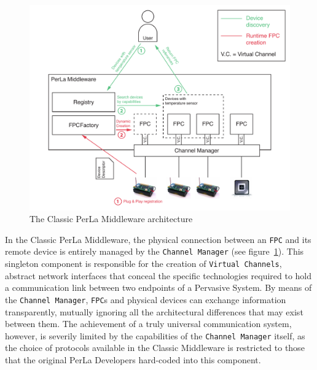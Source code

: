 \begin{figure}[h!]
\includegraphics[width=\textwidth]{imgs/classic_middleware_overview.pdf}
\caption{The Classic PerLa Middleware architecture}
\label{fig:classic_architecture}
\end{figure}

In the Classic PerLa Middleware, the physical connection between an
\texttt{FPC} and its remote device is entirely managed by the \texttt{Channel
Manager} (see figure~\ref{fig:classic_architecture}). This singleton component
is responsible for the creation of \texttt{Virtual Channels}, abstract network
interfaces that conceal the specific technologies required to hold a
communication link between two endpoints of a Pervasive System. By means of the
\texttt{Channel Manager}, \texttt{FPC}s and physical devices can exchange
information transparently, mutually ignoring all the architectural differences
that may exist between them. The achievement of a truly universal communication
system, however, is severily limited by the capabilities of the \texttt{Channel
Manager} itself, as the choice of protocols available in the Classic Middleware
is restricted to those that the original PerLa Developers hard-coded into this
component.

